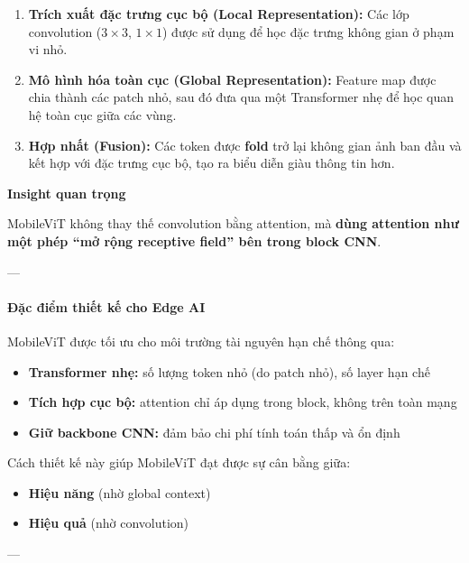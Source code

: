 \begin{enumerate}
	\item \textbf{Trích xuất đặc trưng cục bộ (Local Representation):}  
	Các lớp convolution ($3\times3$, $1\times1$) được sử dụng để học đặc trưng không gian ở phạm vi nhỏ.
	
	\item \textbf{Mô hình hóa toàn cục (Global Representation):}  
	Feature map được chia thành các patch nhỏ, sau đó đưa qua một Transformer nhẹ để học quan hệ toàn cục giữa các vùng.
	
	\item \textbf{Hợp nhất (Fusion):}  
	Các token được \textbf{fold} trở lại không gian ảnh ban đầu và kết hợp với đặc trưng cục bộ, tạo ra biểu diễn giàu thông tin hơn.
\end{enumerate}

\begin{mdframed}[style=infobox]
	\textbf{Insight quan trọng}
	
	MobileViT không thay thế convolution bằng attention,  
	mà \textbf{dùng attention như một phép “mở rộng receptive field” bên trong block CNN}.
\end{mdframed}

---

\paragraph{Đặc điểm thiết kế cho Edge AI}

MobileViT được tối ưu cho môi trường tài nguyên hạn chế thông qua:

\begin{itemize}
	\item \textbf{Transformer nhẹ:} số lượng token nhỏ (do patch nhỏ), số layer hạn chế
	\item \textbf{Tích hợp cục bộ:} attention chỉ áp dụng trong block, không trên toàn mạng
	\item \textbf{Giữ backbone CNN:} đảm bảo chi phí tính toán thấp và ổn định
\end{itemize}

Cách thiết kế này giúp MobileViT đạt được sự cân bằng giữa:
\begin{itemize}
	\item \textbf{Hiệu năng} (nhờ global context)
	\item \textbf{Hiệu quả} (nhờ convolution)
\end{itemize}

---

